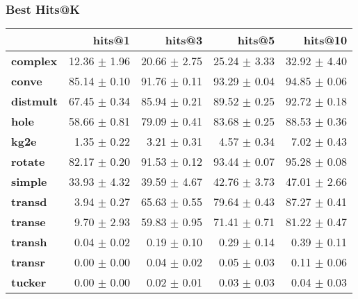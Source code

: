 \documentclass{article}
\begin{document}
    \subsubsection{Best Hits@K}
    \begin{center}
    \begin{tabular}{lrrrr}
\toprule
{} &        hits@1 &        hits@3 &        hits@5 &       hits@10 \\
\midrule
\textbf{complex } &  12.36 $\pm$ 1.96 &  20.66 $\pm$ 2.75 &  25.24 $\pm$ 3.33 &  32.92 $\pm$ 4.40 \\
\textbf{conve   } &  85.14 $\pm$ 0.10 &  91.76 $\pm$ 0.11 &  93.29 $\pm$ 0.04 &  94.85 $\pm$ 0.06 \\
\textbf{distmult} &  67.45 $\pm$ 0.34 &  85.94 $\pm$ 0.21 &  89.52 $\pm$ 0.25 &  92.72 $\pm$ 0.18 \\
\textbf{hole    } &  58.66 $\pm$ 0.81 &  79.09 $\pm$ 0.41 &  83.68 $\pm$ 0.25 &  88.53 $\pm$ 0.36 \\
\textbf{kg2e    } &   1.35 $\pm$ 0.22 &   3.21 $\pm$ 0.31 &   4.57 $\pm$ 0.34 &   7.02 $\pm$ 0.43 \\
\textbf{rotate  } &  82.17 $\pm$ 0.20 &  91.53 $\pm$ 0.12 &  93.44 $\pm$ 0.07 &  95.28 $\pm$ 0.08 \\
\textbf{simple  } &  33.93 $\pm$ 4.32 &  39.59 $\pm$ 4.67 &  42.76 $\pm$ 3.73 &  47.01 $\pm$ 2.66 \\
\textbf{transd  } &   3.94 $\pm$ 0.27 &  65.63 $\pm$ 0.55 &  79.64 $\pm$ 0.43 &  87.27 $\pm$ 0.41 \\
\textbf{transe  } &   9.70 $\pm$ 2.93 &  59.83 $\pm$ 0.95 &  71.41 $\pm$ 0.71 &  81.22 $\pm$ 0.47 \\
\textbf{transh  } &   0.04 $\pm$ 0.02 &   0.19 $\pm$ 0.10 &   0.29 $\pm$ 0.14 &   0.39 $\pm$ 0.11 \\
\textbf{transr  } &   0.00 $\pm$ 0.00 &   0.04 $\pm$ 0.02 &   0.05 $\pm$ 0.03 &   0.11 $\pm$ 0.06 \\
\textbf{tucker  } &   0.00 $\pm$ 0.00 &   0.02 $\pm$ 0.01 &   0.03 $\pm$ 0.03 &   0.04 $\pm$ 0.03 \\
\bottomrule
\end{tabular}

    \end{center}
\end{document}
